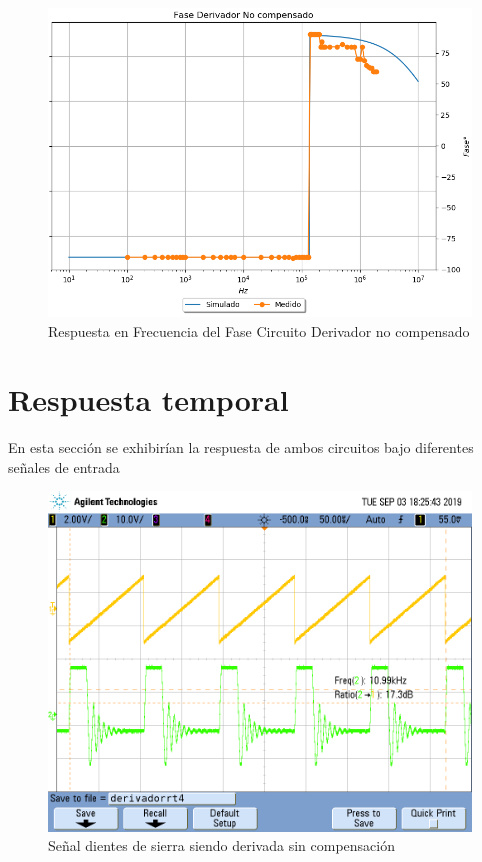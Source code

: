 \documentclass[a4paper]{article}
\begin{document}
\begin{figure}[H]
	\centering
	\includegraphics[width=\textwidth]{Ejercicio4/SUPERPOSICION-FASE-DERIVADOR-NO-COMPENSADO}
	\caption{Respuesta en Frecuencia del Fase Circuito Derivador no compensado}
\end{figure}

\section{Respuesta temporal}
En esta sección se exhibirían la respuesta de ambos circuitos bajo diferentes señales de entrada



\begin{figure}[H]
	\centering
	\includegraphics[width=\textwidth]{Ejercicio4/FOTOS-TP2-TC-EJ4/derivadorrt4}
	\caption{Señal dientes de sierra siendo derivada sin compensación}
\end{figure}
\end{document}
